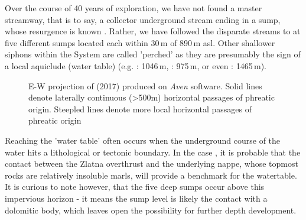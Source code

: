 Over the course of 40 years of exploration, we have not found a master streamway, that is to say, a collector underground stream ending in a sump, whose resurgence is known \citep{hm1}. Rather, we have followed the disparate streams to at five different sumps located each within 30\,m of 890\,m asl. Other shallower siphons within the System are called 'perched'  as they are presumably the sign of a local aquiclude (water table) (e.g. : 1046\,m, : 975\,m, or even : 1465\,m).

\begin{figure}[t!]
 \checkoddpage \ifoddpage \forcerectofloat \else \forceversofloat \fi
\centering
{}
\caption{E-W projection of \protect{} (2017) produced on \emph{Aven} software. Solid lines denote laterally continuous (>500m) horizontal passages of phreatic origin. Steepled lines denote more local horizontal passages of phreatic origin} \label{fig:ew projection}
\end{figure}



Reaching the 'water table' often occurs when the underground course of the water hits a lithological or tectonic boundary. In the case , it is probable that the contact between the Zlatna overthrust and the underlying  nappe, whose topmost rocks are relatively insoluble marls, will provide a benchmark for the watertable. It is curious to note however, that the five deep sumps occur above this impervious horizon - it means the sump level is likely the contact with a dolomitic body, which leaves open the possibility for further depth development. 

